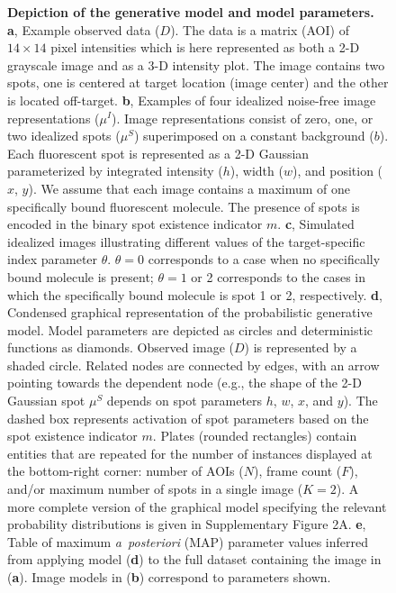 \begin{figure}[t]
\caption{\textbf{Depiction of the generative model and model parameters.} \textbf{a}, Example observed data ($D$). The data is a matrix (AOI) of $14 \times 14$ pixel intensities which is here represented as both a 2-D grayscale image and as a 3-D intensity plot. The image contains two spots, one is centered at target location (image center) and the other is located off-target. \textbf{b}, Examples of four idealized noise-free image representations ($\mu^I$). Image representations consist of zero, one, or two idealized spots ($\mu^S$) superimposed on a constant background ($b$). Each fluorescent spot is represented as a 2-D Gaussian parameterized by integrated intensity ($h$), width ($w$), and position ($x$, $y$). We assume that each image contains a maximum of one specifically bound fluorescent molecule. The presence of spots is encoded in the binary spot existence indicator $m$. \textbf{c}, Simulated idealized images illustrating different values of the target-specific index parameter $\theta$. $\theta = 0$ corresponds to a case when no specifically bound molecule is present; $\theta = 1$ or 2 corresponds to the cases in which the specifically bound molecule is spot 1 or 2, respectively. \textbf{d}, Condensed graphical representation of the probabilistic generative model. Model parameters are depicted as circles and deterministic functions as diamonds. Observed image ($D$) is represented by a shaded circle. Related nodes are connected by edges, with an arrow pointing towards the dependent node (e.g., the shape of the 2-D Gaussian spot $\mu^S$ depends on spot parameters $h$, $w$, $x$, and $y$). The dashed box represents activation of spot parameters based on the spot existence indicator $m$. Plates (rounded rectangles) contain entities that are repeated for the number of instances displayed at the bottom-right corner: number of AOIs ($N$), frame count ($F$), and/or maximum number of spots in a single image ($K=2$). A more complete version of the graphical model specifying the relevant probability distributions is given in Supplementary Figure 2A. \textbf{e}, Table of maximum \emph{a~posteriori} (MAP) parameter values inferred from applying model (\textbf{d}) to the full dataset containing the image in (\textbf{a}). Image models in (\textbf{b}) correspond to parameters shown. }
\label{fig:tapqir_model}
\end{figure}

